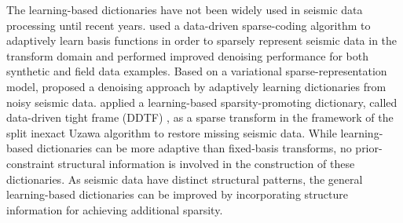 

The learning-based dictionaries have not been widely used in seismic data processing until recent years. \cite{kaplan2009} used a data-driven sparse-coding algorithm to adaptively learn basis functions in order to sparsely represent seismic data in the transform domain and performed improved denoising performance for both synthetic and field data examples. Based on a variational sparse-representation model, \cite{jianwei20142} proposed a denoising approach by adaptively learning dictionaries from noisy seismic data.
\cite{jianwei2014} applied a learning-based sparsity-promoting dictionary, called data-driven tight frame (DDTF) \cite[]{jianfeng2013}, as a sparse transform in the framework of the split inexact Uzawa algorithm to restore missing seismic data.  While learning-based dictionaries can be more adaptive than fixed-basis transforms, no prior-constraint structural information is involved in the construction of these dictionaries. As seismic data have distinct structural patterns, the general learning-based dictionaries can be improved by incorporating structure information for achieving additional sparsity.

